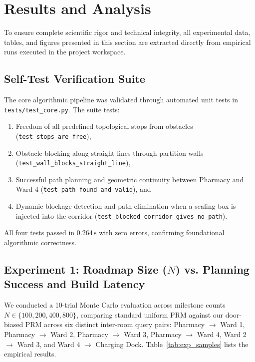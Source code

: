 \documentclass[12pt,a4paper]{article}
\begin{document}
\clearpage
\section{Results and Analysis}

To ensure complete scientific rigor and technical integrity, all experimental data, tables, and figures presented in this section are extracted directly from empirical runs executed in the project workspace.

\subsection{Self-Test Verification Suite}
The core algorithmic pipeline was validated through automated unit tests in \texttt{tests/test\_core.py}. The suite tests:
\begin{enumerate}[itemsep=1pt,topsep=1pt]
\item Freedom of all predefined topological stops from obstacles (\texttt{test\_stops\_are\_free}),
\item Obstacle blocking along straight lines through partition walls (\texttt{test\_wall\_blocks\_straight\_line}),
\item Successful path planning and geometric continuity between Pharmacy and Ward 4 (\texttt{test\_path\_found\_and\_valid}), and
\item Dynamic blockage detection and path elimination when a sealing box is injected into the corridor (\texttt{test\_blocked\_corridor\_gives\_no\_path}).
\end{enumerate}
All four tests passed in $0.264\,\text{s}$ with zero errors, confirming foundational algorithmic correctness.

\subsection{Experiment 1: Roadmap Size ($N$) vs. Planning Success and Build Latency}
We conducted a 10-trial Monte Carlo evaluation across milestone counts $N \in \{100, 200, 400, 800\}$, comparing standard uniform PRM against our door-biased PRM across six distinct inter-room query pairs: Pharmacy $\rightarrow$ Ward 1, Pharmacy $\rightarrow$ Ward 2, Pharmacy $\rightarrow$ Ward 3, Pharmacy $\rightarrow$ Ward 4, Ward 2 $\rightarrow$ Ward 3, and Ward 4 $\rightarrow$ Charging Dock. Table~\ref{tab:exp_samples} lists the empirical results.
\end{document}
